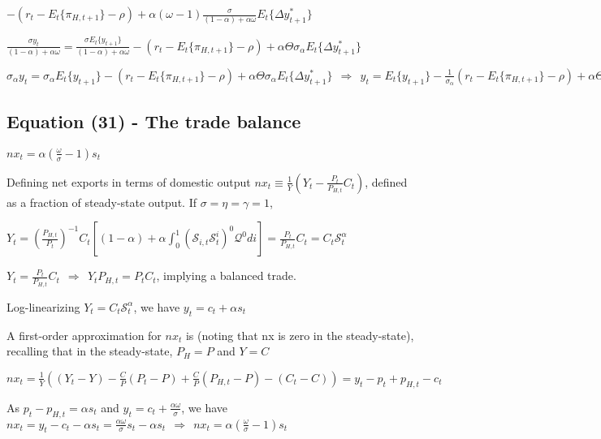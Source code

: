 \documentclass[
]{article}
\begin{document}
\(\displaystyle -(r_t-E_t\{\pi_{H,t+1}\} -\rho)+ \alpha (\omega-1) \frac{\sigma}{(1-\alpha)+\alpha \omega} E_t\{\Delta y_{t+1}^*\}\)

\(\displaystyle \frac{\sigma y_t}{(1-\alpha)+\alpha \omega}= \frac{\sigma E_t\{y_{t+1}\} }{(1-\alpha)+\alpha \omega}-(r_t-E_t\{\pi_{H,t+1}\} -\rho)+ \alpha \Theta \sigma_\alpha E_t\{\Delta y_{t+1}^*\}\)

\(\displaystyle \sigma_\alpha y_t= \sigma_\alpha E_t\{y_{t+1}\} -(r_t-E_t\{\pi_{H,t+1}\} -\rho)+ \alpha \Theta \sigma_\alpha E_t\{\Delta y_{t+1}^*\} \ \ \Rightarrow \ \  y_t= E_t\{y_{t+1}\} -\frac{1}{\sigma_\alpha}(r_t-E_t\{\pi_{H,t+1}\} -\rho)+ \alpha \Theta E_t\{\Delta y_{t+1}^*\}\)

\vspace{12pt}

\hypertarget{equation-31---the-trade-balance}{%
\subsection{Equation (31) - The trade
balance}\label{equation-31---the-trade-balance}}

\(\displaystyle nx_t = \alpha \left(\frac{\omega}{\sigma} - 1 \right) s_t\)

\vspace{8pt}

Defining net exports in terms of domestic output
\(\displaystyle nx_t \equiv \frac{1}{Y}\left( Y_t - \frac{P_t}{P_{H,t}}C_t \right)\),
defined as a fraction of steady-state output. If
\(\sigma=\eta=\gamma=1\),

\(\displaystyle Y_t = \left( \frac{P_{H,t}}{P_t} \right)^{-1} C_t \left[ (1-\alpha) + \alpha \int_0^1 \left( \mathcal{S}_{i,t} \mathcal{S}_t^i\right)^{0} \mathcal{Q}^{0} di \right] = \frac{P_{t}}{P_{H,t}} C_t=C_t \mathcal{S}_t^\alpha\)

\(\displaystyle Y_t = \frac{P_{t}}{P_{H,t}} C_t \ \ \Rightarrow \ \ Y_t P_{H,t}=P_tC_t\),
implying a balanced trade.

Log-linearizing \(Y_t=C_t \mathcal{S}_t^\alpha\), we have
\(y_t = c_t + \alpha s_t\)

A first-order approximation for \(nx_t\) is (noting that nx is zero in
the steady-state), recalling that in the steady-state, \(P_H=P\) and
\(Y=C\)

\(\displaystyle nx_t = \frac{1}{Y} \left( (Y_t-Y)-\frac{C}{P}(P_t-P)+\frac{C}{P}(P_{H,t}-P) - (C_t-C) \right)=y_t-p_t+p_{H,t}-c_t\)

As \(p_t-p_{H,t}=\alpha s_t\) and
\(\displaystyle y_t = c_t+\frac{\alpha \omega}{\sigma}\), we have
\(\displaystyle nx_t=y_t-c_t-\alpha s_t= \frac{\alpha \omega}{\sigma}s_t - \alpha s_t \ \ \Rightarrow \ \ nx_t = \alpha \left(\frac{\omega}{\sigma} - 1 \right) s_t\)
\end{document}

